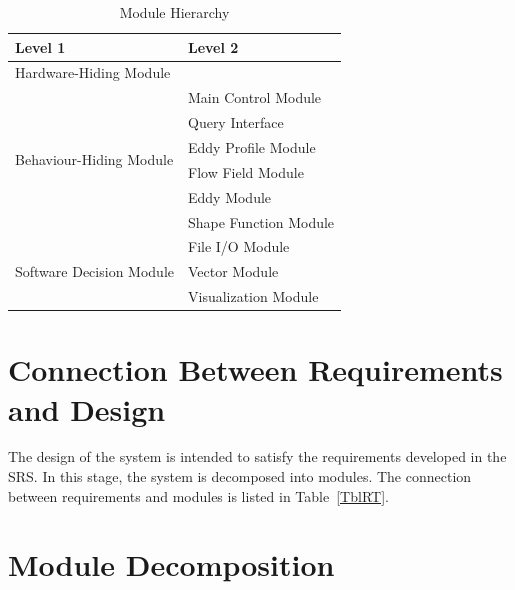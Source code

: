 \documentclass[12pt, titlepage]{article}
\begin{document}
\begin{table}[h!]
\centering
\begin{tabular}{p{} p{}}
\toprule
\textbf{Level 1} & \textbf{Level 2}\\
\midrule

{Hardware-Hiding Module} & ~ \\
\midrule

\multirow{6}{0.3\textwidth}{Behaviour-Hiding Module}
& Main Control Module\\
& Query Interface\\
& Eddy Profile Module\\
& Flow Field Module\\
& Eddy Module\\
& Shape Function Module\\
\midrule

\multirow{3}{0.3\textwidth}{Software Decision Module} 
& File I/O Module\\
& Vector Module\\
& Visualization Module\\
\bottomrule

\end{tabular}
\caption{Module Hierarchy}
\label{TblMH}
\end{table}

\section{Connection Between Requirements and Design} \label{SecConnection}

The design of the system is intended to satisfy the requirements developed in
the SRS. In this stage, the system is decomposed into modules. The connection
between requirements and modules is listed in Table~\ref{TblRT}.


\section{Module Decomposition} \label{SecMD}
\end{document}
